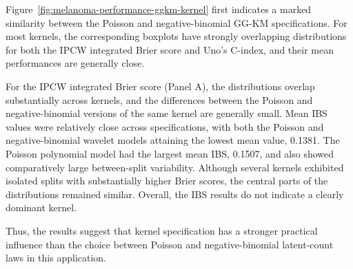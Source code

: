 Figure~\ref{fig:melanoma-performance-ggkm-kernel} first indicates a marked
similarity between the Poisson and negative-binomial GG-KM specifications.
For most kernels, the corresponding boxplots have strongly overlapping
distributions for both the IPCW integrated Brier score and
Uno's C-index, and their mean performances are generally
close.

For the IPCW integrated Brier score (Panel A), the distributions overlap
substantially across kernels, and the differences between the Poisson and
negative-binomial versions of the same kernel are generally small. Mean IBS
values were relatively close across specifications, with both the Poisson
and negative-binomial wavelet models attaining the lowest mean value, 0.1381.
The Poisson polynomial model had the largest mean IBS, 0.1507, and also
showed comparatively large between-split variability. Although several
kernels exhibited isolated splits with substantially higher Brier scores,
the central parts of the distributions remained similar. Overall, the IBS
results do not indicate a clearly dominant kernel.

Thus, the results suggest that
kernel specification has a stronger practical influence than the choice
between Poisson and negative-binomial latent-count laws in this application.
